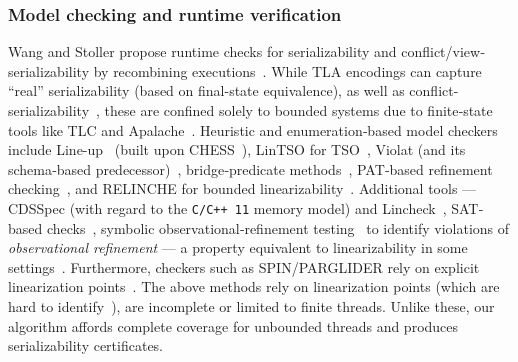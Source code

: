 \subsubsection{Model checking and runtime verification}

Wang and Stoller propose runtime checks for serializability and conflict/view‐serializability by recombining executions~\cite{WaSt06a,WaSt06b}. 
While TLA encodings can capture ``real'' serializability (based on final-state 
equivalence), as well as conflict-serializability~\cite{CoOlPnTuZu07}, these are confined solely to bounded systems due to finite‐state tools like TLC and Apalache~\cite{YuMaLa99,KoKuTr19}. Heuristic and enumeration‐based model checkers include Line-up~\cite{BuDeMuTa10} (built upon CHESS~\cite{MuQaBaBaNaNe08}), LinTSO for TSO~\cite{BuGoMuYa12}, Violat (and its schema‐based predecessor)~\cite{EmEn19,EmEn18}, bridge‐predicate methods~\cite{BuNeSe11,BuSe09}, PAT‐based refinement checking~\cite{LiChLiSuZhDo12,SuLuDoPa09,LiChLiSu09,Zh11}, and RELINCHE for bounded linearizability~\cite{GoKoVa25}. Additional tools --- CDSSpec (with regard to the \texttt{C/C++ 11} memory model) and Lincheck~\cite{KoDeSoTsAl23,OuDe17}, SAT‐based checks~\cite{BuAlMa07}, symbolic observational‐refinement testing~\cite{EmEnHa15} to identify violations of \textit{observational refinement} --- a property equivalent to linearizability in some settings~\cite{FiOhRiYa10, 
	BoEmCoHa15}.
Furthermore, checkers such as SPIN/PARGLIDER rely on explicit linearization points~\cite{Fl04, VeYaYo09,Ho97,VeYa08}.
 The above methods rely on linearization points (which are hard to identify~\cite{VeYaYo09}), are incomplete or limited to finite threads. 
 Unlike these, our algorithm affords complete coverage for unbounded threads and produces serializability certificates.



